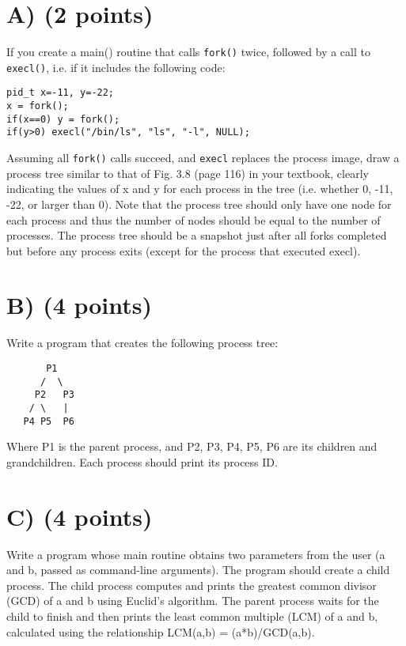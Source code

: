 \documentclass{article}
\begin{document}
\section*{A) (2 points)}
If you create a main() routine that calls \texttt{fork()} twice, followed by a call to \texttt{execl()}, i.e. if it includes the following code:
\begin{verbatim}
pid_t x=-11, y=-22;
x = fork();
if(x==0) y = fork();
if(y>0) execl("/bin/ls", "ls", "-l", NULL);
\end{verbatim}
Assuming all \texttt{fork()} calls succeed, and \texttt{execl} replaces the process image, draw a process tree similar to that of Fig. 3.8 (page 116) in your textbook, clearly indicating the values of x and y for each process in the tree (i.e. whether 0, -11, -22, or larger than 0).  Note that the process tree should only have one node for each process and thus the number of nodes should be equal to the number of processes. The process tree should be a snapshot just after all forks completed but before any process exits (except for the process that executed execl).



\section*{B) (4 points)}
Write a program that creates the following process tree:

\begin{verbatim}
       P1
      /  \
     P2   P3
    / \   |
   P4 P5  P6
\end{verbatim}
Where P1 is the parent process, and P2, P3, P4, P5, P6 are its children and grandchildren.  Each process should print its process ID.


\section*{C) (4 points)}
Write a program whose main routine obtains two parameters from the user (a and b, passed as command-line arguments). The program should create a child process. The child process computes and prints the greatest common divisor (GCD) of a and b using Euclid's algorithm. The parent process waits for the child to finish and then prints the least common multiple (LCM) of a and b, calculated using the relationship LCM(a,b) = (a*b)/GCD(a,b).
\end{document}
